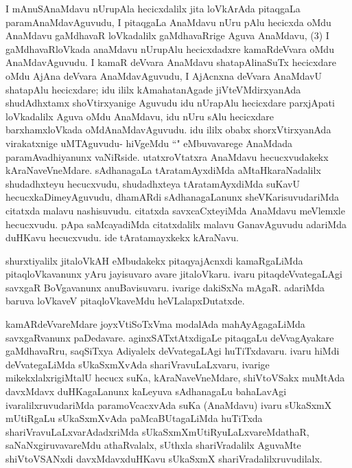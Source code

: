 \begin{artha}
I mAnuSAnaMdavu nUrupAla hecicxdalilx jita loVkArAda pitaqgaLa paramAnaMdavAguvudu, I pitaqgaLa AnaMdavu nUru pAlu hecicxda oMdu AnaMdavu gaMdhavaR loVkadalilx gaMdhavaRrige Aguva AnaMdavu, (3) I gaMdhavaRloVkada anaMdavu nUrupAlu hecicxdadxre kamaRdeVvara oMdu AnaMdavAguvudu. I kamaR deVvara AnaMdavu shatapAlinaSuTx hecicxdare oMdu AjAna deVvara AnaMdavAguvudu, I AjAcnxna deVvara AnaMdavU shatapAlu hecicxdare; idu ililx kAmahatanAgade jiVteVMdirxyanAda shudAdhxtamx shoVtirxyanige Aguvudu idu nUrapAlu hecicxdare parxjApati loVkadalilx Aguva oMdu AnaMdavu, idu nUru sAlu hecicxdare barxhamxloVkada oMdAnaMdavAguvudu. idu ililx obabx shorxVtirxyanAda virakatxnige uMTAguvudu- hiVgeMdu ``\stext" eMbuvavarege AnaMdada paramAvadhiyanunx vaNiRside. utatxroVtatxra AnaMdavu hecucxvudakekx kAraNaveVneMdare. sAdhanagaLa tAratamAyxdiMda aMtaHkaraNadalilx shudadhxteyu hecucxvudu, shudadhxteya tAratamAyxdiMda suKavU hecucxkaDimeyAguvudu, dhamARdi sAdhanagaLanunx sheVKarisuvudariMda citatxda malavu nashisuvudu. citatxda savxcaCxteyiMda AnaMdavu meVlemxle hecucxvudu. pApa saMcayadiMda citatxdalilx malavu GanavAguvudu adariMda duHKavu hecucxvudu. ide tAratamayxkekx kAraNavu. 
\end{artha}%

\begin{artha}
shurxtiyalilx jitaloVkAH eMbudakekx pitaqyajAcnxdi kamaRgaLiMda pitaqloVkavanunx yAru jayisuvaro avare jitaloVkaru. ivaru pitaqdeVvategaLAgi savxgaR BoVgavanunx anuBavisuvaru. ivarige dakiSxNa mAgaR. adariMda baruva loVkaveV pitaqloVkaveMdu heVLalapxDutatxde. 
\end{artha}

\begin{artha}
kamARdeVvareMdare joyxVtiSoTxVma modalAda mahAyAgagaLiMda savxgaRvanunx paDedavare. aginxSATxtAtxdigaLe pitaqgaLu deVvagAyakare gaMdhavaRru, saqSiTxya Adiyalelx deVvategaLAgi huTiTxdavaru. ivaru hiMdi deVvategaLiMda sUkaSxmXvAda shariVravuLaLxvaru, ivarige mikekxlalxrigiMtalU hecucx suKa, kAraNaveVneMdare, shiVtoVSakx muMtAda davxMdavx duHKagaLanunx kaLeyuva sAdhanagaLu bahaLavAgi ivaralilxruvudariMda paramoVcacxvAda suKa (AnaMdavu) ivaru sUkaSxmX mUtiRgaLu sUkaSxmXvAda paMcaBUtagaLiMda huTiTxda shariVravuLaLxvarAdadxriMda sUkaSxmXmUtiRyuLaLxvareMdathaR, saNaNxgiruvavareMdu athaRvalalx, sUthxla shariVradalilx AguvaMte shiVtoVSANxdi davxMdavxduHKavu sUkaSxmX shariVradalilxruvudilalx. 
\end{artha}%

